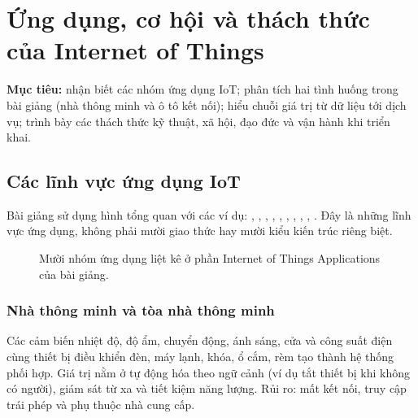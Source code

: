 \chapter{Ứng dụng, cơ hội và thách thức của Internet of Things}
\label{chap:applications}
\begin{notebox}
\textbf{Mục tiêu:} nhận biết các nhóm ứng dụng IoT; phân tích hai tình huống trong bài giảng (nhà thông minh và ô tô kết nối); hiểu chuỗi giá trị từ dữ liệu tới dịch vụ; trình bày các thách thức kỹ thuật, xã hội, đạo đức và vận hành khi triển khai.
\end{notebox}
\section{Các lĩnh vực ứng dụng IoT}
Bài giảng sử dụng hình tổng quan với các ví dụ: , , , , , , , , , . Đây là những lĩnh vực ứng dụng, không phải mười giao thức hay mười kiểu kiến trúc riêng biệt.

\begin{figure}[H]\centering
{}\caption{Mười nhóm ứng dụng liệt kê ở phần Internet of Things Applications của bài giảng.}
\end{figure}

\subsection{Nhà thông minh và tòa nhà thông minh}
Các cảm biến nhiệt độ, độ ẩm, chuyển động, ánh sáng, cửa và công suất điện cùng thiết bị điều khiển đèn, máy lạnh, khóa, ổ cắm, rèm tạo thành hệ thống phối hợp. Giá trị nằm ở tự động hóa theo ngữ cảnh (ví dụ tắt thiết bị khi không có người), giám sát từ xa và tiết kiệm năng lượng. Rủi ro: mất kết nối, truy cập trái phép và phụ thuộc nhà cung cấp.
